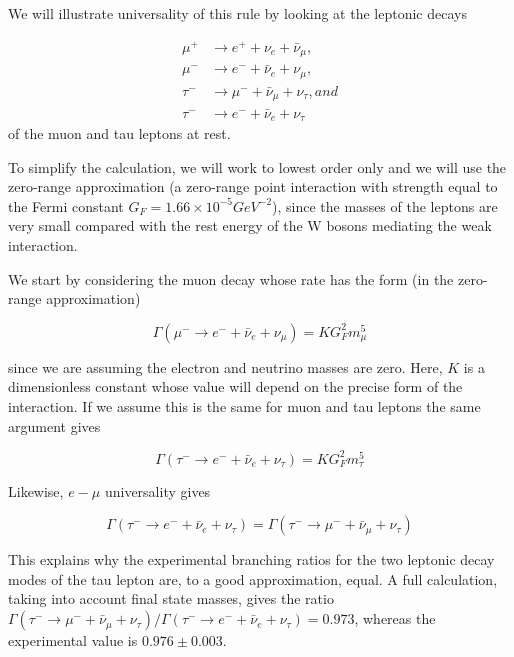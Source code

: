 	We will illustrate universality of this rule by looking at the leptonic decays \cite{MartinShaw}

	\begin{align}\label{eq2.4.1}
	\mu^{+}&\rightarrow e^{+} + \nu_{e} + \bar{\nu}_{\mu},\\
	\mu^{-}&\rightarrow e^{-} + \bar{\nu}_{e} + \nu_{\mu},\\
	\tau^{-}&\rightarrow \mu^{-} + \bar{\nu}_{\mu} + \nu_{\tau}, and\\
	\tau^{-}&\rightarrow e^{-} + \bar{\nu}_{e} + \nu_{\tau}
	\end{align}
	of the muon and tau leptons at rest. 

	To simplify the calculation, we will work to lowest order only and we will use the zero-range approximation (a zero-range point interaction with strength equal to the Fermi constant $G_{F}=1.66\times 10^{-5} GeV^{-2}$), since the masses of the leptons are very small compared with the rest energy of the W bosons mediating the weak interaction.

	We start by considering the muon decay whose rate has the form (in the zero-range approximation)

	\begin{equation}\label{eq2.4.2}
	\Gamma(\mu^{-}\rightarrow e^{-} + \bar{\nu}_{e} + \nu_{\mu}) = KG_{F}^{2}m_{\mu}^{5}
	\end{equation}

	since we are assuming the electron and neutrino masses are zero. Here, $K$ is a dimensionless constant whose value will depend on the precise form of the interaction. If we assume this is the same for muon and tau leptons the same argument gives

	\begin{equation}
	\Gamma(\tau^{-}\rightarrow e^{-} + \bar{\nu}_{e} + \nu_{\tau}) = KG_{F}^{2}m_{\tau}^{5}
	\end{equation}

	Likewise, $e - \mu$ universality gives

	\begin{equation}
	\Gamma(\tau^{-}\rightarrow e^{-} + \bar{\nu}_{e} + \nu_{\tau}) = \Gamma(\tau^{-}\rightarrow \mu^{-} + \bar{\nu}_{\mu} + \nu_{\tau})
	\end{equation}

	This explains why the experimental branching ratios for the two leptonic decay modes of the tau lepton are, to a good approximation, equal. A full calculation, taking into account final state masses, gives the ratio $\Gamma(\tau^{-}\rightarrow \mu^{-} + \bar{\nu}_{\mu} + \nu_{\tau})/\Gamma(\tau^{-}\rightarrow e^{-} + \bar{\nu}_{e} + \nu_{\tau})=0.973$, whereas the experimental value is $0.976\pm0.003$.

